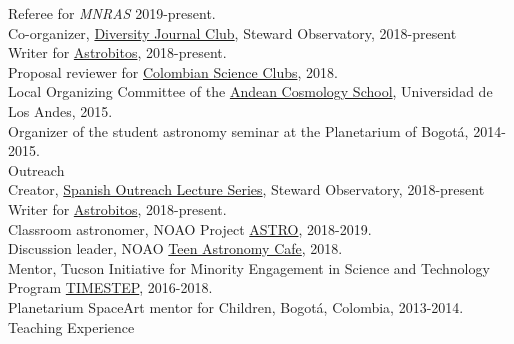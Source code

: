 \documentclass[UTF8]{article}
\begin{document}
\indent\indent Referee for \textit{MNRAS} 2019-present.\\ 
\indent\indent Co-organizer, \href{https://www.as.arizona.edu/diversity_coffee/}{Diversity Journal Club}, Steward Observatory, 2018-present\\
\indent\indent Writer for \href{https://astrobitos.org/}{Astrobitos}, 2018-present.\\ 
\indent\indent Proposal reviewer for \href{https://clubesdeciencia.co/}{Colombian Science Clubs}, 2018.\\
\indent\indent Local Organizing Committee of the \href{http://forero.github.io/AndeanCosmologySchool/}{Andean Cosmology School}, Universidad de Los Andes, 2015.\\
\indent\indent Organizer of the student astronomy seminar at the Planetarium of Bogot\'a, 2014-2015.\\



{\Large Outreach}\\

\indent\indent Creator, \href{https://astrocharlas.github.io/}{Spanish Outreach Lecture Series}, Steward Observatory, 2018-present\\
\indent\indent Writer for \href{https://astrobitos.org/}{Astrobitos}, 2018-present.\\ 
\indent\indent Classroom astronomer, NOAO Project \href{https://www.noao.edu/education/astro/}{ASTRO}, 2018-2019.\\
\indent\indent Discussion leader, NOAO \href{http://www.teenastronomycafe.org/}{Teen Astronomy Cafe}, 2018.\\
\indent\indent Mentor, Tucson Initiative for Minority Engagement in Science and Technology Program \href{https://lavinia.as.arizona.edu/~timestep/}{TIMESTEP}, 2016-2018.\\
\indent\indent Planetarium SpaceArt mentor for Children, Bogot\'a, Colombia, 2013-2014.\\


{\Large Teaching Experience}\\
\end{document}
